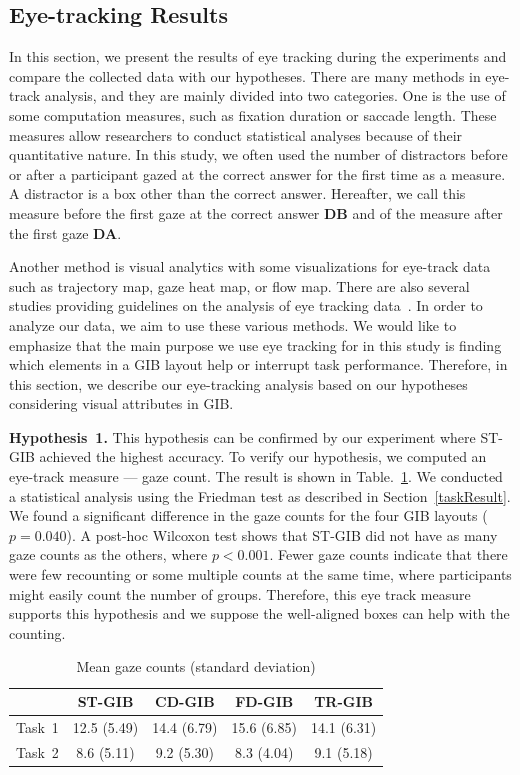 \documentclass[review]{vgtc}                 %
\begin{document}
\subsection{Eye-tracking Results}
\label{eyetrack}
In this section, we present the results of eye tracking during the experiments and compare the collected data with our hypotheses.
There are many methods in eye-track analysis, and they are mainly divided into two categories. One is the use of some computation measures, such as fixation duration or saccade length.
These measures allow researchers to conduct statistical analyses because of their quantitative nature.
In this study, we often used the number of distractors before or after a participant gazed at the correct answer for the first time as a measure.
A distractor is a box other than the correct answer.
Hereafter, we call this measure before the first gaze at the correct answer {\bf DB} and of the measure after the first gaze {\bf DA}.

Another method is visual analytics with some visualizations for eye-track data such as trajectory map, gaze heat map, or flow map.
There are also several studies providing guidelines on the analysis of eye tracking data~\cite{andrienko2012visual,duchowski2007eye,kurzhals2014evaluating}. In order to analyze our data, we aim to use these various methods. We would like to emphasize that the main purpose we use eye tracking for in this study is finding which elements in a GIB layout help or interrupt task performance. Therefore, in this section, we describe our eye-tracking analysis based on our hypotheses considering visual attributes in GIB.

{\bf Hypothesis~1.} This hypothesis can be confirmed by our experiment where ST-GIB achieved the highest accuracy.
To verify our hypothesis, we computed an eye-track measure --- gaze count.
The result is shown in Table.~\ref{gazecount}.
We conducted a statistical analysis using the Friedman test as described in Section~\ref{taskResult}.
We found a significant difference in the gaze counts for the four GIB layouts ($p=0.040$). A post-hoc Wilcoxon test shows that ST-GIB did not have as many gaze counts as the others, where $p<0.001$. Fewer gaze counts indicate that there were few recounting or some multiple counts at the same time, where participants might easily count the number of groups. Therefore, this eye track measure supports this hypothesis and we suppose the well-aligned boxes can help with the counting.

\begin{table}[b]
  \begin{center}
    \caption{Mean gaze counts (standard deviation)}
    \label{gazecount}
    \begin{tabular}{|c|c|c|c|c|} \hline
      & ST-GIB & CD-GIB & FD-GIB & TR-GIB \\ \hline
      Task~1 & 12.5 (5.49) & 14.4 (6.79) & 15.6 (6.85) & 14.1 (6.31) \\ \hline
      Task~2 & 8.6 (5.11) & 9.2 (5.30) & 8.3 (4.04) & 9.1 (5.18) \\ \hline
    \end{tabular}
    \end{center}
\end{table}
\end{document}
